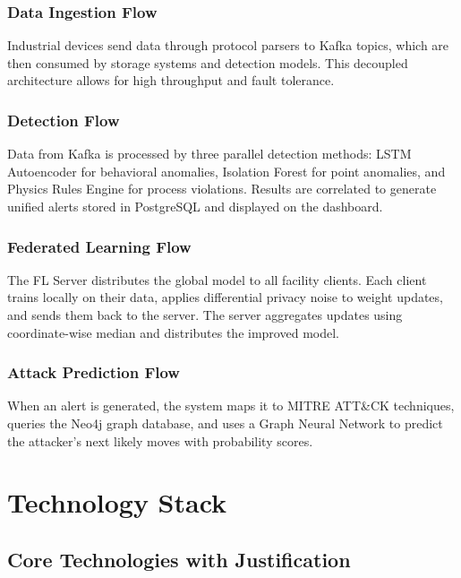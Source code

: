 \documentclass[12pt,a4paper]{article}
\begin{document}
\subsubsection{Data Ingestion Flow}

Industrial devices send data through protocol parsers to Kafka topics, which are then consumed by storage systems and detection models. This decoupled architecture allows for high throughput and fault tolerance.

\subsubsection{Detection Flow}

Data from Kafka is processed by three parallel detection methods: LSTM Autoencoder for behavioral anomalies, Isolation Forest for point anomalies, and Physics Rules Engine for process violations. Results are correlated to generate unified alerts stored in PostgreSQL and displayed on the dashboard.

\subsubsection{Federated Learning Flow}

The FL Server distributes the global model to all facility clients. Each client trains locally on their data, applies differential privacy noise to weight updates, and sends them back to the server. The server aggregates updates using coordinate-wise median and distributes the improved model.

\subsubsection{Attack Prediction Flow}

When an alert is generated, the system maps it to MITRE ATT\&CK techniques, queries the Neo4j graph database, and uses a Graph Neural Network to predict the attacker's next likely moves with probability scores.


\section{Technology Stack}

\subsection{Core Technologies with Justification}
\end{document}
